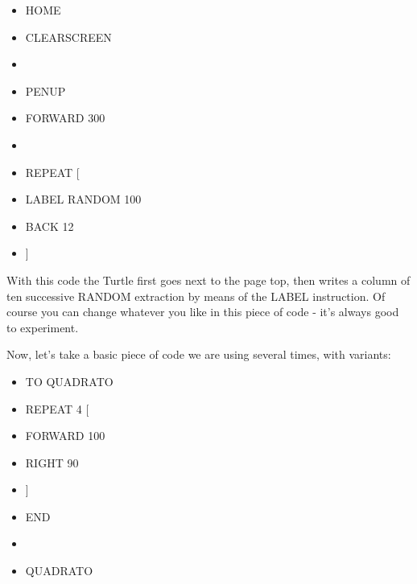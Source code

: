 \vskip 1cm

\begin{scriptsize}
\begin{minipage}{0.50\textwidth}
\begin{itemize}[itemsep=-3pt,parsep=2pt, leftmargin=-0.0mm ]
\item[] HOME
\item[] CLEARSCREEN 
\item[] 
\item[] PENUP
\item[] FORWARD 300
\item[] 
\item[] REPEAT [
\item[] \hspace{8pt} LABEL RANDOM 100
\item[] \hspace{8pt} BACK 12
\item[] ]                      
\end{itemize}
\end{minipage}
\end{scriptsize}

\vskip 1cm

With this code the Turtle first goes next to the page top, then writes a column of ten successive RANDOM extraction by means of the LABEL instruction. Of course you can change whatever you like in this piece of code - it's always good to experiment.

Now, let's take a basic piece of code we are using several times, with variants:

\vskip 1cm

\begin{scriptsize}
\begin{minipage}{0.50\textwidth}
\begin{itemize}[itemsep=-3pt,parsep=2pt, leftmargin=-0.0mm ]
\item[] TO QUADRATO                 
\item[] \hspace{8pt} 	REPEAT 4 [ 
\item[] \hspace{8pt}\hspace{8pt}		FORWARD 100 
\item[] \hspace{8pt}\hspace{8pt}		RIGHT 90
\item[] \hspace{8pt}	]
\item[] END                            
\item[] 
\item[] QUADRATO
\end{itemize}
\end{minipage}
\end{scriptsize}

